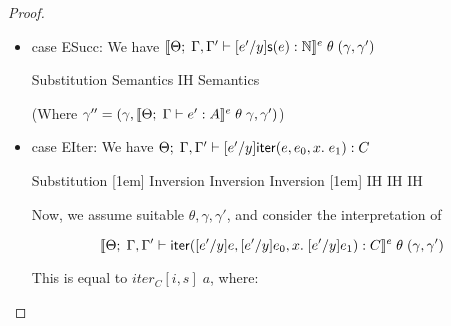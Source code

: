 \begin{proof}
\begin{itemize}
\item case ESucc: We have $[\![{{\Theta};\;{\Gamma, \Gamma'} \vdash {[e'/y]\mathsf{s}(e)} : {\mathbb{N}}}]\!]^e\;\theta\;(\gamma, \gamma')$

  \begin{eqnproof}
          {Substitution}
          {Semantics}
          {IH}
          {Semantics}
  \end{eqnproof}

  (Where $\gamma'' = (\gamma, [\![{{\Theta};\;{\Gamma} \vdash {e'} : {A}}]\!]^e\;\theta\;\gamma, \gamma')$)

\item case EIter: We have ${\Theta};\;{\Gamma, \Gamma'} \vdash {[e'/y]\mathsf{iter}(e, {e_0}, {x}.\; {e_1})} : {C}$
  \begin{eqnproof}
          {Substitution}
          [1em]
          {Inversion}
          {Inversion}
          {Inversion}
          [1em]
          {IH}
          {IH}               
          {IH}               
  \end{eqnproof}
  Now, we assume suitable $\theta, \gamma, \gamma'$, and consider the 
  interpretation of 

  $$[\![{{\Theta};\;{\Gamma, \Gamma'} \vdash {\mathsf{iter}([e'/y]e, {[e'/y]e_0}, {x}.\; {[e'/y]e_1})} : {C}}]\!]^e\;\theta\;(\gamma, \gamma')$$ 

  This is equal to $iter_C[i,s]\;a$, where:


\end{itemize}
\end{proof}
